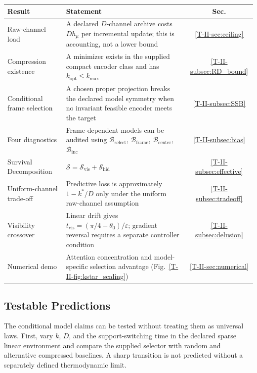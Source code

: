 \documentclass[12pt,a4paper,openany]{book}
\begin{document}
\begin{center}
\small
\setlength{\tabcolsep}{4pt}%
\begin{tabular}{@{}lP{6cm}c@{}}
\toprule
\textbf{Result} & \textbf{Statement} & \textbf{Sec.} \\
\midrule
Raw-channel load
  & A declared $D$-channel archive costs $D h_\mu$ per
    incremental update; this is accounting, not a lower bound
  & \ref{T-II-sec:ceiling} \\[3pt]
Compression existence
  & A minimizer exists in the supplied compact encoder class and has
    $k_{\mathrm{opt}}\leq k_{\max}$
  & \ref{T-II-subsec:RD_bound} \\[3pt]
Conditional frame selection
  & A chosen proper projection breaks the declared model symmetry when
    no invariant feasible encoder meets the target
  & \ref{T-II-subsec:SSB} \\[3pt]
Four diagnostics
  & Frame-dependent models can be audited using $\mathcal{B}_{\mathrm{select}}$,
    $\mathcal{B}_{\mathrm{frame}}$,
    $\mathcal{B}_{\mathrm{center}}$,
    $\mathcal{B}_{\mathrm{inc}}$
  & \ref{T-II-subsec:bias} \\[3pt]
Survival Decomposition
  & $\mathcal{S} = \mathcal{S}_{\mathrm{vis}} +
    \mathcal{S}_{\mathrm{hid}}$
  & \ref{T-II-subsec:effective} \\[3pt]
Uniform-channel trade-off
  & Predictive loss is approximately $1-k^*/D$ only under the
    uniform raw-channel assumption
  & \ref{T-II-subsec:tradeoff} \\[3pt]
Visibility crossover
  & Linear drift gives $t_{\mathrm{vis}}=(\pi/4-\theta_0)/\varepsilon$;
    gradient reversal requires a separate controller condition
  & \ref{T-II-subsec:delusion} \\[3pt]
Numerical demo
  & Attention concentration and model-specific selection advantage
    (Fig.~\ref{T-II-fig:kstar_scaling})
  & \ref{T-II-sec:numerical} \\
\bottomrule
\end{tabular}
\end{center}

\subsection{Testable Predictions}
\label{T-II-subsec:predictions}

The conditional model claims can be tested without treating them as
universal laws.  First, vary $k$, $D$, and the support-switching time in
the declared sparse linear environment and compare the supplied selector
with random and alternative compressed baselines.  A sharp transition is
not predicted without a separately defined thermodynamic limit.
\end{document}
